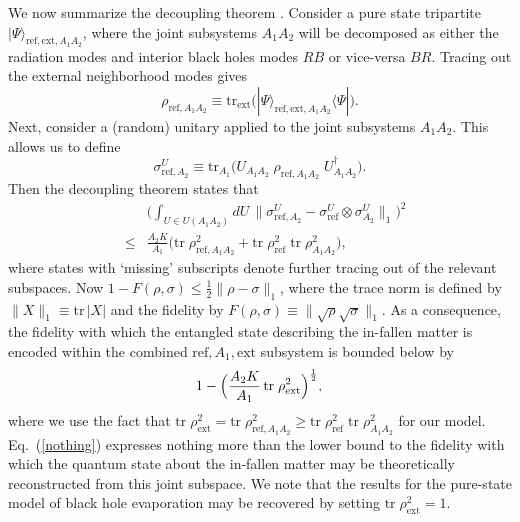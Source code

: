 \documentclass[twocolumn,aps,prl,amsmath,amssymb,floatfix]{revtex4}
\begin{document}
We now summarize the decoupling theorem \cite{Abey06}.
Consider a pure state tripartite
$|\Psi\rangle_{\text{ref},\text{ext},A_1A_2}$,
where the joint subsystems $A_1A_2$ will be decomposed as either
the radiation modes and interior black holes modes $RB$ or vice-versa
$BR$. Tracing out the external neighborhood modes gives
\begin{equation}
\rho_{\text{ref},A_1A_2}\equiv \text{tr}_{\text{ext}}
\bigl(|\Psi\rangle_{\text{ref},\text{ext},A_1A_2} \langle\Psi|\bigr).
\end{equation}
Next, consider a (random) unitary applied to the joint subsystems $A_1A_2$.
This allows us to define
\begin{equation}
\sigma_{\text{ref},A_2}^U\equiv 
\text{tr}_{A_1} \bigl(U_{A_1A_2}\;
\rho_{\text{ref},A_1A_2}\; U_{A_1A_2}^\dagger\bigr).
\end{equation}
Then the decoupling theorem \cite{Abey06} states that
\begin{eqnarray}
&&\biggl(\int_{U\in U(A_1A_2)}dU\,\bigl\| \sigma_{\text{ref},A_2}^U-
\sigma_{\text{ref}}^U\otimes \sigma_{A_2}^U\bigr\|_1\biggr)^2\nonumber\\
&\le& \frac{A_2 K}{A_1}\bigl(\text{tr}\; \rho_{\text{ref},A_1A_2}^2
+\text{tr}\; \rho_{\text{ref}}^2 \;\text{tr}\; \rho_{A_1A_2}^2\bigr),
\end{eqnarray}
where states with `missing' subscripts denote further tracing out of
the relevant subspaces. Now
$1-F(\rho,\sigma) \le \frac{1}{2}\|\rho-\sigma\|_1$, where the trace
norm is defined by $\|X\|_1\equiv \text{tr}\, |X|$ and the fidelity
by $F(\rho,\sigma)\equiv \|\sqrt{\rho}\sqrt{\sigma}\|_1$.
As a consequence, the fidelity with which the entangled state
describing the in-fallen matter is encoded within the combined
$\text{ref},A_1,\text{ext}$ subsystem is bounded below by \cite{me}
\begin{equation}
\!1-\Bigl(\frac{A_2 K}{A_1}\, \text{tr}\; \rho_{\text{ext}}^2
\Bigr)^{\frac{1}{2}}, \label{nothing}
\end{equation}
where we use the fact that 
$\text{tr}\; \rho_{\text{ext}}^2=
\text{tr}\; \rho_{\text{ref},A_1A_2}^2\ge
\text{tr}\; \rho_{\text{ref}}^2 \;\text{tr}\; \rho_{A_1A_2}^2$
for our model. Eq.~(\ref{nothing}) expresses nothing more than the
lower bound to the fidelity with which the quantum state about the
in-fallen matter may be theoretically reconstructed from this joint
subspace. We note that the results for the pure-state model of black
hole evaporation \cite{Hayden07} may be recovered by setting
$\text{tr}\; \rho_{\text{ext}}^2=1$.
\end{document}
